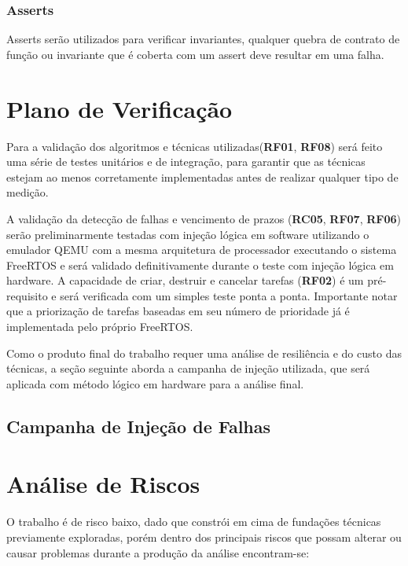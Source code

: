 \subsubsection{Asserts}

Asserts serão utilizados para verificar invariantes, qualquer quebra de contrato de função ou invariante que é coberta com um assert deve resultar em uma falha.

\section{Plano de Verificação}

Para a validação dos algoritmos e técnicas utilizadas(\textbf{RF01}, \textbf{RF08}) será feito uma série de testes unitários e de integração, para garantir que as técnicas estejam ao menos corretamente implementadas antes de realizar qualquer tipo de medição.

A validação da detecção de falhas e vencimento de prazos (\textbf{RC05}, \textbf{RF07}, \textbf{RF06}) serão preliminarmente testadas com injeção lógica em software utilizando o emulador QEMU com a mesma arquitetura de processador executando o sistema FreeRTOS e será validado definitivamente durante o teste com injeção lógica em hardware. A capacidade de criar, destruir e cancelar tarefas (\textbf{RF02}) é um pré-requisito e será verificada com um simples teste ponta a ponta. Importante notar que a priorização de tarefas baseadas em seu número de prioridade já é implementada pelo próprio FreeRTOS.

Como o produto final do trabalho requer uma análise de resiliência e do custo das técnicas, a seção seguinte aborda a campanha de injeção utilizada, que será aplicada com método lógico em hardware para a análise final.

\subsection{Campanha de Injeção de Falhas} \label{subsec:campanhaInjecao}


\section{Análise de Riscos} \label{sec:analiseRiscos}

O trabalho é de risco baixo, dado que constrói em cima de fundações técnicas previamente exploradas, porém dentro dos principais riscos que possam alterar ou causar problemas durante a produção da análise encontram-se:


